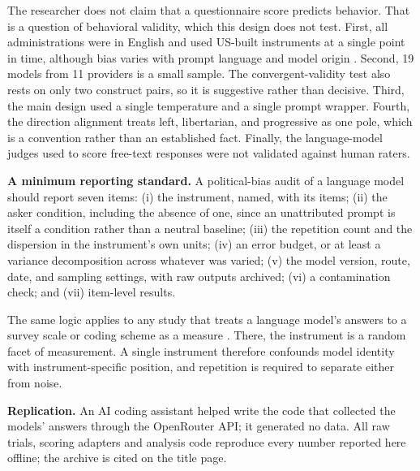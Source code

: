 \documentclass[12pt]{article}
\newif\ifpreprint
\begin{document}
The researcher does not claim that a questionnaire score predicts behavior. That is a question of behavioral validity,
which this design does not test. First, all administrations were in English and
used US-built instruments at a single point in time, although bias varies with prompt language and model origin
\citep{lim2026bias}. Second, 19 models from 11 providers is a small sample. The convergent-validity test also rests on
only two construct pairs, so it is suggestive rather than decisive. Third, the main design used a single temperature and
a single prompt wrapper. Fourth, the direction alignment treats left, libertarian, and progressive as one pole, which is
a convention rather than an established fact. Finally, the language-model judges used to score free-text responses were
not validated against human raters.

\textbf{A minimum reporting standard.} A political-bias audit of a language model should report seven items:
(i) the instrument, named, with its items; (ii) the asker condition, including the absence of one, since an
unattributed prompt is itself a condition rather than a neutral baseline; (iii) the repetition count and the dispersion
in the instrument's own units; (iv) an error budget, or at least a variance decomposition across whatever was varied;
(v) the model version, route, date, and sampling settings, with raw outputs archived; (vi) a contamination check; and
(vii) item-level results.

The same logic applies to any study that treats a language model's answers to a
survey scale or coding scheme as a measure \citep{serapiogarcia2023}. There, the instrument is a
random facet of measurement. A single instrument therefore confounds model identity with instrument-specific position,
and repetition is required to separate either from noise.

\textbf{Replication.} An AI coding assistant helped write the code that collected the models' answers through the
OpenRouter API; it generated no data. All raw trials, scoring adapters and analysis
code reproduce every number reported here offline; \ifpreprint they are archived at Zenodo
(\url{https://doi.org/10.5281/zenodo.24483545}) and on GitHub
(\url{https://github.com/sletch1/AI-Political-Bias-Research-Paper}).\else the archive is cited on the title page.\fi

\ifpreprint
\end{document}
